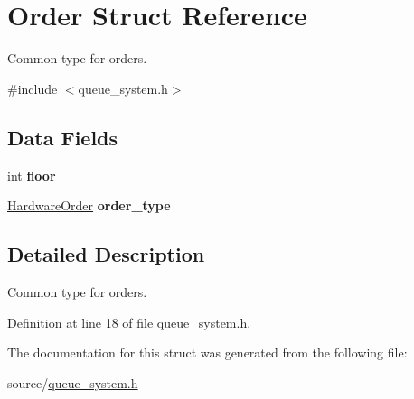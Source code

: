 \hypertarget{structOrder}{}\section{Order Struct Reference}
\label{structOrder}


Common type for orders.  




{\ttfamily \#include $<$queue\+\_\+system.\+h$>$}

\subsection*{Data Fields}
\begin{DoxyCompactItemize}
\item 
\mbox{\label{structOrder_a5243dc659272f25ee0b39a569b9bbd43}} 
int {\bfseries floor}
\item 
\mbox{\label{structOrder_aeddebdba3b07c66358921945e8710825}} 
\hyperlink{hardware_8h_a796a8de8ce0ae769d7dbd3327a7bdbe7}{Hardware\+Order} {\bfseries order\+\_\+type}
\end{DoxyCompactItemize}


\subsection{Detailed Description}
Common type for orders. 

Definition at line 18 of file queue\+\_\+system.\+h.



The documentation for this struct was generated from the following file\+:\begin{DoxyCompactItemize}
\item 
source/\hyperlink{queue__system_8h}{queue\+\_\+system.\+h}\end{DoxyCompactItemize}

